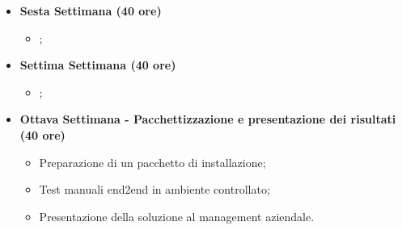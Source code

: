 {\begin{itemize}
\begin{itemize}
            \item ;
        \end{itemize}
        \item \textbf{Sesta Settimana (40 ore)} 
        \begin{itemize}        	
            \item ;
        \end{itemize}
        \item \textbf{Settima Settimana (40 ore)} 
        \begin{itemize}
            \item ;
        \end{itemize}
        \item \textbf{Ottava Settimana - Pacchettizzazione e presentazione dei risultati (40 ore)} 
        \begin{itemize}
            \item Preparazione di un pacchetto di installazione;
            \item Test manuali end2end in ambiente
controllato;
			\item Presentazione della soluzione al management aziendale.
        \end{itemize}
    \end{itemize}
}

\newcommand{\totaleOre}{}

\newcommand{\obiettiviObbligatori}{
	 \item \underline{\textit{O01}}: primo obiettivo;
	 \item \underline{\textit{O02}}: secondo obiettivo;
	 \item \underline{\textit{O03}}: terzo obiettivo;
	 
}

\newcommand{\obiettiviDesiderabili}{
	 \item \underline{\textit{D01}}: primo obiettivo;
	 \item \underline{\textit{D02}}: secondo obiettivo;
}

\newcommand{\obiettiviFacoltativi}{
	 \item \underline{\textit{F01}}: primo obiettivo;
	 \item \underline{\textit{F02}}: secondo obiettivo;
	 \item \underline{\textit{F03}}: terzo obiettivo;
}